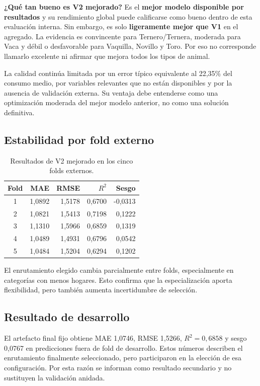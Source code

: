 \documentclass[11pt,a4paper]{article}
\begin{document}
\textbf{¿Qué tan bueno es V2 mejorado?} Es el \textbf{mejor modelo disponible por resultados} y su rendimiento global puede calificarse como bueno dentro de esta evaluación interna. Sin embargo, es solo \textbf{ligeramente mejor que V1} en el agregado. La evidencia es convincente para Ternero/Ternera, moderada para Vaca y débil o desfavorable para Vaquilla, Novillo y Toro. Por eso no corresponde llamarlo excelente ni afirmar que mejora todos los tipos de animal.

La calidad continúa limitada por un error típico equivalente al 22,35\% del consumo medio, por variables relevantes que no están disponibles y por la ausencia de validación externa. Su ventaja debe entenderse como una optimización moderada del mejor modelo anterior, no como una solución definitiva.

\subsection{Estabilidad por fold externo}

\begin{table}[H]
\centering
\caption{Resultados de V2 mejorado en los cinco folds externos.}
\begin{tabular}{crrrr}
\toprule
\textbf{Fold} & \textbf{MAE} & \textbf{RMSE} & \textbf{$R^2$} & \textbf{Sesgo}\\
\midrule
1 & 1,0892 & 1,5178 & 0,6700 & -0,0313\\
2 & 1,0821 & 1,5413 & 0,7198 & 0,1222\\
3 & 1,1310 & 1,5966 & 0,6859 & 0,1319\\
4 & 1,0489 & 1,4931 & 0,6796 & 0,0542\\
5 & 1,0484 & 1,5204 & 0,6294 & 0,1202\\
\bottomrule
\end{tabular}
\end{table}

El enrutamiento elegido cambia parcialmente entre folds, especialmente en categorías con menos hogares. Esto confirma que la especialización aporta flexibilidad, pero también aumenta incertidumbre de selección.

\subsection{Resultado de desarrollo}

El artefacto final fijo obtiene MAE 1,0746, RMSE 1,5266, $R^2=0,6858$ y sesgo 0,0767 en predicciones fuera de fold de desarrollo. Estos números describen el enrutamiento finalmente seleccionado, pero participaron en la elección de esa configuración. Por esta razón se informan como resultado secundario y no sustituyen la validación anidada.
\end{document}
